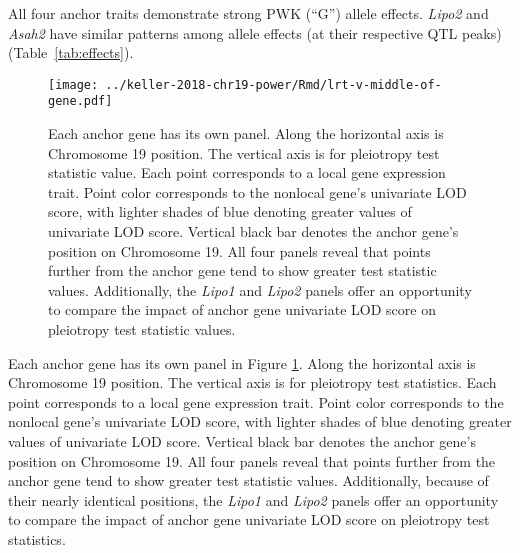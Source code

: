 \documentclass{book}
\begin{document}
All four anchor traits demonstrate strong PWK (``G'') allele effects. \emph{Lipo2} and \emph{Asah2} have similar patterns among allele effects (at their respective QTL peaks) (Table~\ref{tab:effects}).



\begin{figure}
    \centering
    \texttt{[image: ../keller-2018-chr19-power/Rmd/lrt-v-middle-of-gene.pdf]}
    \caption[Pleiotropy LRT vs. chromosomal position plots reveal that higher values of pleiotropy LRT tend to correspond to greater interlocus distance and greater univariate LOD score.]{Each anchor gene has its own panel. Along the horizontal axis is Chromosome 19 position. The vertical axis is for pleiotropy test statistic value. Each point corresponds to a local gene expression trait. Point color corresponds to the nonlocal gene's univariate LOD score, with lighter shades of blue denoting greater values of univariate LOD score. Vertical black bar denotes the anchor gene's position on Chromosome 19. All four panels reveal that points further from the anchor gene tend to show greater test statistic values. Additionally, the \emph{Lipo1} and \emph{Lipo2} panels offer an opportunity to compare the impact of anchor gene univariate LOD score on pleiotropy test statistic values.}
    \label{fig:middle}
\end{figure}

Each anchor gene has its own panel in Figure \ref{fig:middle}. Along the horizontal axis is Chromosome 19 position. The vertical axis is for pleiotropy test statistics. Each point corresponds to a local gene expression trait. Point color corresponds to the nonlocal gene's univariate LOD score, with lighter shades of blue denoting greater values of univariate LOD score. Vertical black bar denotes the anchor gene's position on Chromosome 19. All four panels reveal that points further from the anchor gene tend to show greater test statistic values. Additionally, because of their nearly identical positions, the \emph{Lipo1} and \emph{Lipo2} panels offer an opportunity to compare the impact of anchor gene univariate LOD score on pleiotropy test statistics.




\end{document}
